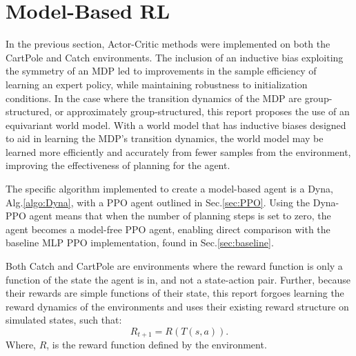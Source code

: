 \section{Model-Based RL}\label{sec:model-based}
In the previous section, Actor-Critic methods were implemented on both the CartPole and Catch environments. The inclusion of an inductive bias exploiting the symmetry of an MDP led to improvements in the sample efficiency of learning an expert policy, while maintaining robustness to initialization conditions.
In the case where the transition dynamics of the MDP are group-structured, or approximately group-structured, this report proposes the use of an equivariant world model. With a world model that has inductive biases designed to aid in learning the MDP's transition dynamics, the world model may be learned more efficiently and accurately from fewer samples from the environment, improving the effectiveness of planning for the agent.

The specific algorithm implemented to create a model-based agent is a Dyna, Alg.\ref{algo:Dyna}, with a PPO agent outlined in Sec.\ref{sec:PPO}. Using the Dyna-PPO agent means that when the number of planning steps is set to zero, the agent becomes a model-free PPO agent, enabling direct comparison with the baseline MLP PPO implementation, found in Sec.\ref{sec:baseline}.

Both Catch and CartPole are environments where the reward function is only a function of the state the agent is in, and not a state-action pair. Further, because their rewards are simple functions of their state, this report forgoes learning the reward dynamics of the environments and uses their existing reward structure on simulated states, such that:
\begin{equation}
	R_{t+1} = R(T(s, a)).
\end{equation}
Where, $R$, is the reward function defined by the environment.

